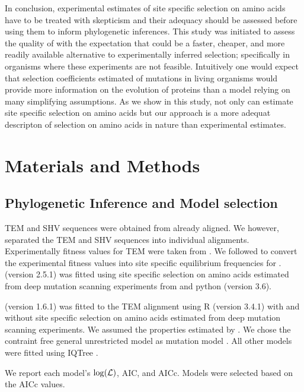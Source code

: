 In conclusion, experimental estimates of site specific selection on amino acids have to be treated with skepticism and their adequacy should be assessed before using them to inform phylogenetic inferences.
This study was initiated to assess the quality of \selac with the expectation that \selac could be a faster, cheaper, and more readily available alternative to experimentally inferred selection;
specifically in organisms where these experiments are not feasible.
Intuitively one would expect that selection coefficients estimated of mutations in living organisms would provide more information on the evolution of proteins than a model relying on many simplifying assumptions.
As we show in this study, not only can \selac estimate site specific selection on amino acids but our approach is a more adequat descripton of selection on amino acids in nature than experimental estimates.


\section{Materials and Methods}

\subsection{Phylogenetic Inference and Model selection}

TEM and SHV sequences were obtained from \citet{bloom2017} already aligned.
We however, separated the TEM and SHV sequences into individual alignments.
Experimentally fitness values for TEM were taken from \citet{stiffler2016}.
We followed \citep{bloom2017} to convert the experimental fitness values into site specific equilibrium frequencies for \phydms. 
\phydms (version 2.5.1) was fitted using site specific selection on amino acids estimated from deep mutation scanning experiments from \citet{stiffler2016} and python (version 3.6).

\selac (version 1.6.1) was fitted to the TEM alignment using R (version 3.4.1) \citep{rcore} with and without site specific selection on amino acids estimated from deep mutation scanning experiments.
We assumed the \PC properties estimated by \citet{grantham1974}.
We chose the contraint free  general unrestricted model \citep{yang1994} as mutation model .
All other models were fitted using IQTree \citep{nguyen2015}.

We report each model's $\log(\mathcal{L})$, AIC, and  AICc. 
Models were selected based on the AICc values.

